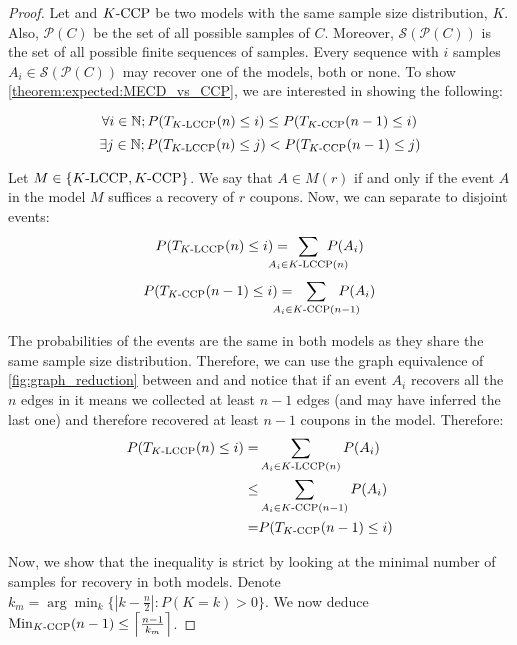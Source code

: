 \begin{proof}
Let 
and $\ccpg{K}{n}$ be two models with the same sample size distribution, $K$.
Also, $\mathcal{P}(C)$ be the set of all possible samples of $C$.
Moreover, $\mathcal{S}(\mathcal{P}(C))$ is the set of all possible finite sequences of samples.
Every sequence with $i$ samples $A_i \in \mathcal{S}(\mathcal{P}(C))$ may recover one of the models, both or none.
To show \autoref{theorem:expected:MECD_vs_CCP}, we are interested in showing the following:

\[\forall i  \in \mathbb{N} ; P(\T{\fmecd{K}{P}{n}}{n} \leq i) \leq P(\T{\ccpg{K}{n}}{n-1} \leq i)\]
\[\exists j \in \mathbb{N} ; P(\T{\fmecd{K}{P}{n}}{n} \leq j) < P(\T{\ccpg{K}{n}}{n-1} \leq j)\]

Let $M \in \{\efmecd, \eccpg\}$. 
We say that $A\in M(r)$ 
if and only if 
the event $A$ in the model $M$ suffices a recovery of $r$ coupons. 
Now, we can separate to disjoint events: 
\[ P(\T{\fmecd{K}{P}{n}}{n} \leq i) =
\hspace{-0.6cm}
\sum_{A_i \in \fmecd{K}{P}{n}(n)} \hspace{-0.6cm}  P(A_i)
\]
\vspace{-1ex}
\[ P(\T{\ccpg{K}{n}}{n-1} \leq i) =
\hspace{-0.6cm} 
\sum_{A_i \in \ccpg{K}{n}(n-1)} \hspace{-0.6cm} P(A_i)
\]

The probabilities of the events are the same in both models as they share the same sample size distribution.
Therefore, we can use the graph equivalence of \autoref{fig:graph_reduction} 
between  and  
and notice that if an event $A_i$ recovers all the $n$ edges in  
it means we collected at least $n-1$ edges (and may have inferred the last one) 
and therefore recovered at least $n-1$ coupons in the  model.
Therefore:
\vspace{-1ex}
\begin{align*}
P(\T{\fmecd{K}{P}{n}}{n} \leq i) = & 
\sum_{A_i \in \fmecd{K}{P}{n}(n)} P(A_i) \\
\leq & \sum_{A_i \in \ccpg{K}{n}(n-1)} P(A_i)\\
= & P(\T{\ccpg{K}{n}}{n-1} \leq i)
\end{align*}

Now, we show that the inequality is strict by looking at the minimal number of samples for recovery in both models.
Denote $k_m=\arg\min_{k}\{|k - \frac{n}{2}| : P(K=k)>0\}$.
We now deduce $\Min{\ccpg{K}{n}}{n-1} \leq \left\lceil\frac{n-1}{k_m}\right\rceil$.


\end{proof}
